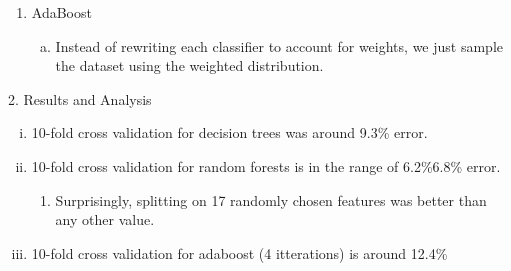 \documentclass[paper=a4, fontsize=11pt]{scrartcl} %
\numberwithin{equation}{section} %
\numberwithin{figure}{section} %
\numberwithin{table}{section} %
\begin{document}
\begin{enumerate}[(1)]
\item AdaBoost
\begin{enumerate}[(a)]
\item Instead of rewriting each classifier to account for weights, we just sample the dataset using the weighted distribution.
\end{enumerate}

\end{enumerate}

\newpage %
 {\Large 2. \indent Results and Analysis}
\\

\begin{enumerate}[(i)]
\item 10-fold cross validation for decision trees was around 9.3\% error.
\item 10-fold cross validation for random forests is in the range of 6.2\%6.8\% error.
\begin{enumerate}[-]
\item Surprisingly, splitting on 17 randomly chosen features was better than any other value. 
\end{enumerate}
\item 10-fold cross validation for adaboost (4 itterations) is around 12.4\%
\end{enumerate}
\end{document}
